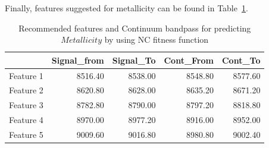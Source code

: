 {Finally, features suggested for metallicity 
can be found in Table~\ref{tab:tab_NC_M}.

\begin{table}
\begin{center}
\begin{tabular}{rrrrr}
  \hline
 & Signal\_from & Signal\_To & Cont\_From & Cont\_To \\ 
  \hline
Feature 1 & 8516.40 & 8538.00 & 8548.80 & 8577.60 \\ 
Feature 2 & 8620.80 & 8628.00 & 8635.20 & 8671.20 \\ 
Feature 3 & 8782.80 & 8790.00 & 8797.20 & 8818.80 \\ 
Feature 4 & 8970.00 & 8977.20 & 8916.00 & 8952.00 \\ 
Feature 5 & 9009.60 & 9016.80 & 8980.80 & 9002.40 \\ 
   \hline
\end{tabular}
\caption {Recommended features and Continuum bandpass for predicting $Metallicity$ 
      by using NC fitness function} \label{tab:tab_NC_M} 
\end{center}
\end{table}


}